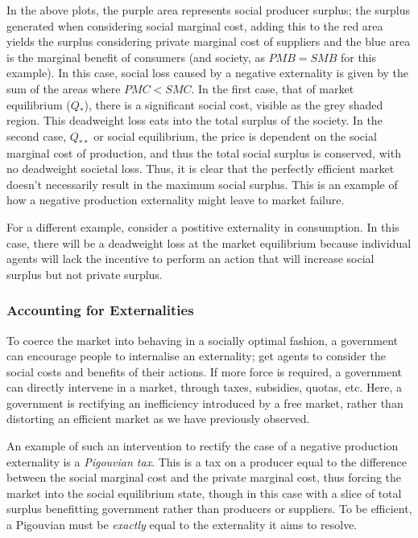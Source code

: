 \documentclass[12pt]{report}
\begin{document}
In the above plots, the purple area represents social producer surplus;
the surplus generated when considering social marginal cost, adding this to
the red area yields the surplus considering private marginal cost of 
suppliers and the blue area is the marginal benefit of consumers (and 
society, as \(PMB = SMB\) for this example). In this case, social loss 
caused by a negative externality is given by the sum of the areas where
\(PMC < SMC\). In the first case, that of market equilibrium (\(Q_*\)),
there is a significant social cost, visible as the grey shaded region.
This deadweight loss eats into the total surplus of the society.
In the second case, \(Q_{**}\) or social equilibrium, the price is 
dependent on the social marginal cost of production, and thus the total
social surplus is conserved, with no deadweight societal loss.
Thus, it is clear that the perfectly efficient market doesn't necessarily
result in the maximum social surplus. This is an example of how a negative
production externality might leave to market failure.

\bigskip
For a different example, consider a postitive externality in consumption.
In this case, there will be a deadweight loss at the market equilibrium
because individual agents will lack the incentive to perform an action
that will increase social surplus but not private surplus.

\subsubsection*{Accounting for Externalities}
To coerce the market into behaving in a socially optimal fashion, a
government can encourage people to internalise an externality; get
agents to consider the social costs and benefits of their actions.
If more force is required, a government can directly intervene in a
market, through taxes, subsidies, quotas, etc. Here, a government
is rectifying an inefficiency introduced by a free market, rather
than distorting an efficient market as we have previously observed.

\bigskip
An example of such an intervention to rectify the case of a negative
production externality is a \textit{Pigouvian tax}. This is a tax on
a producer equal to the difference between the social marginal cost
and the private marginal cost, thus forcing the market into the
social equilibrium state, though in this case with a slice of total
surplus benefitting government rather than producers or suppliers.
To be efficient, a Pigouvian must be \textit{exactly} equal to the
externality it aims to resolve.
\end{document}
